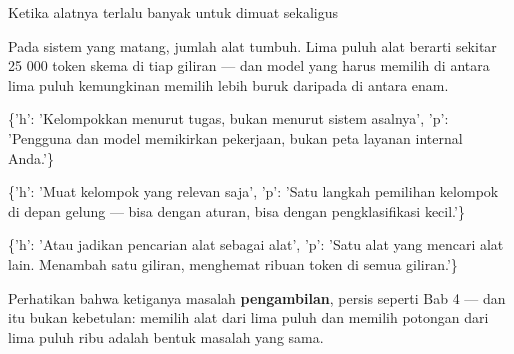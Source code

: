 \documentclass[aspectratio=169,11pt,t]{beamer}
\begin{document}
\begin{frame}[shrink=25]{Ketika alatnya terlalu banyak untuk dimuat sekaligus}
{\fontsize{9.4}{12.6}\selectfont\color{fg2}Pada sistem yang matang, jumlah alat tumbuh. Lima puluh alat berarti sekitar 25 000 token skema di tiap giliran --- dan model yang harus memilih di antara lima puluh kemungkinan memilih lebih buruk daripada di antara enam.\par}\vskip 4pt
\begin{isteps}
\item \{'h': 'Kelompokkan menurut tugas, bukan menurut sistem asalnya', 'p': 'Pengguna dan model memikirkan pekerjaan, bukan peta layanan internal Anda.'\}
\item \{'h': 'Muat kelompok yang relevan saja', 'p': 'Satu langkah pemilihan kelompok di depan gelung --- bisa dengan aturan, bisa dengan pengklasifikasi kecil.'\}
\item \{'h': 'Atau jadikan pencarian alat sebagai alat', 'p': 'Satu alat yang mencari alat lain. Menambah satu giliran, menghemat ribuan token di semua giliran.'\}
\end{isteps}
\begin{iband}[signal]
Perhatikan bahwa ketiganya masalah \textbf{pengambilan}, persis seperti Bab 4 --- dan itu bukan kebetulan: memilih alat dari lima puluh dan memilih potongan dari lima puluh ribu adalah bentuk masalah yang sama.
\end{iband}
\end{frame}
\end{document}
